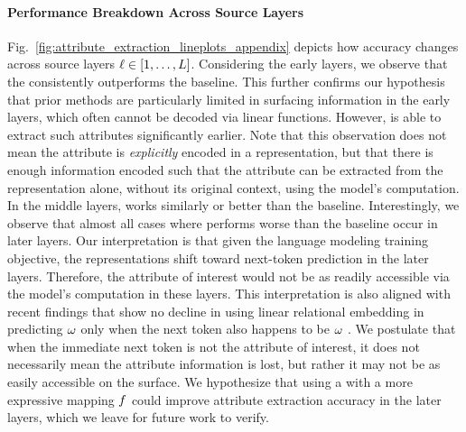 \documentclass{article}
\theoremstyle{plain}
\theoremstyle{definition}
\theoremstyle{remark}
\begin{document}
\paragraph{Performance Breakdown Across Source Layers}
Fig.~\ref{fig:attribute_extraction_lineplots_appendix} depicts how accuracy changes across source layers $\ell \in [1, \ldots, L]$. Considering the early layers, we observe that the \methodName{} consistently outperforms the baseline. This further confirms our hypothesis that prior methods are particularly limited in surfacing information in the early layers, which often cannot be decoded via linear functions.
However, \methodName{} is able to extract such attributes significantly earlier. Note that this observation does not mean the attribute is \textit{explicitly} encoded in a representation, but that there is enough information encoded such that the attribute can be extracted from the representation alone, without its original context, using the model's computation.
In the middle layers, \methodName{} works similarly or better than the baseline.
Interestingly, we observe that almost all cases where \methodName{} performs worse than the baseline occur in later layers. Our interpretation is that given the language modeling training objective, the representations shift toward next-token prediction in the later layers. Therefore, the attribute of interest would not be as readily accessible via the model's computation in these layers.
This interpretation is also aligned with recent findings that show no decline in using linear relational embedding in predicting $\omega$ only when the next token also happens to be $\omega$ \cite{hernandez2023linearity}. We postulate that when the immediate next token is not the attribute of interest, it does not necessarily mean the attribute information is lost, but rather it may not be as easily accessible on the surface. We hypothesize that using a \methodName{} with a more expressive mapping $f$ could improve attribute extraction accuracy in the later layers, which we leave for future work to verify.
\end{document}

